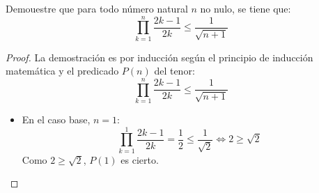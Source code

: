 \begin{ejercicio}
    Demouestre que para todo número natural $n$ no nulo, se tiene que:
    \begin{equation*}
        \prod_{k=1}^n \frac{2k-1}{2k} \leq \frac{1}{\sqrt{n+1}}
    \end{equation*}
    \begin{proof}
        La demostración es por inducción según el principio de inducción matemática y el predicado $P(n)$ del tenor:
        \begin{equation*}
            \prod_{k=1}^n \frac{2k-1}{2k} \leq \frac{1}{\sqrt{n+1}}
        \end{equation*}
        \begin{itemize}
            \item En el caso base, $n=1$:
                \begin{equation*}
                    \prod_{k=1}^1 \frac{2k-1}{2k} = \frac{1}{2} \leq \frac{1}{\sqrt{2}} \Longleftrightarrow 2 \geq \sqrt{2}
                \end{equation*}
                Como $2 \geq \sqrt{2}$, $P(1)$ es cierto.


\end{itemize}
\end{proof}
\end{ejercicio}
